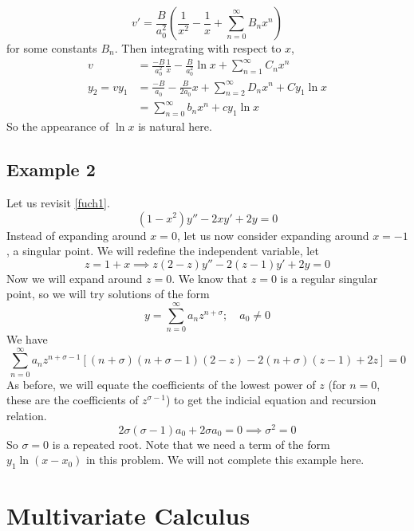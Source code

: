 \documentclass{article}
\begin{document}
\begin{itemize}
          \[ v' = \frac{B}{a_0^2}\left( \frac{1}{x^2} - \frac{1}{x} + \sum_{n=0}^\infty B_n x^n \right) \]
          for some constants $B_n$. Then integrating with respect to $x$,
          \begin{align*}
              v          & = \frac{-B}{a_0^2}\frac{1}{x} - \frac{B}{a_0^2}\ln x + \sum_{n=1}^\infty C_n x^n \\
              y_2 = vy_1 & = \frac{-B}{a_0} - \frac{B}{2a_0}x + \sum_{n=2}^\infty D_n x^n + Cy_1\ln x       \\
                         & = \sum_{n=0}^\infty b_nx^n + cy_1\ln x
          \end{align*}
          So the appearance of $\ln x$ is natural here.
\end{itemize}

\subsection{Example 2}
Let us revisit \eqref{fuch1}.
\[ (1-x^2)y'' - 2xy' + 2y = 0 \]
Instead of expanding around $x=0$, let us now consider expanding around $x=-1$, a singular point. We will redefine the independent variable, let
\[ z = 1 + x \implies z(2-z)y'' - 2(z-1)y' + 2y = 0 \]
Now we will expand around $z=0$. We know that $z=0$ is a regular singular point, so we will try solutions of the form
\[ y = \sum_{n=0}^\infty a_nz^{n+\sigma};\quad a_0 \neq 0 \]
We have
\[ \sum_{n=0}^\infty a_nz^{n+\sigma-1}\left[ (n+\sigma)(n+\sigma-1)(2-z) - 2(n+\sigma)(z-1) + 2z \right] = 0 \]
As before, we will equate the coefficients of the lowest power of $z$ (for $n=0$, these are the coefficients of $z^{\sigma - 1}$) to get the indicial equation and recursion relation.
\[ 2\sigma(\sigma - 1)a_0 + 2\sigma a_0 = 0 \implies \sigma^2 = 0 \]
So $\sigma = 0$ is a repeated root. Note that we need a term of the form $y_1\ln (x-x_0)$ in this problem. We will not complete this example here.

\section{Multivariate Calculus}
\end{document}
